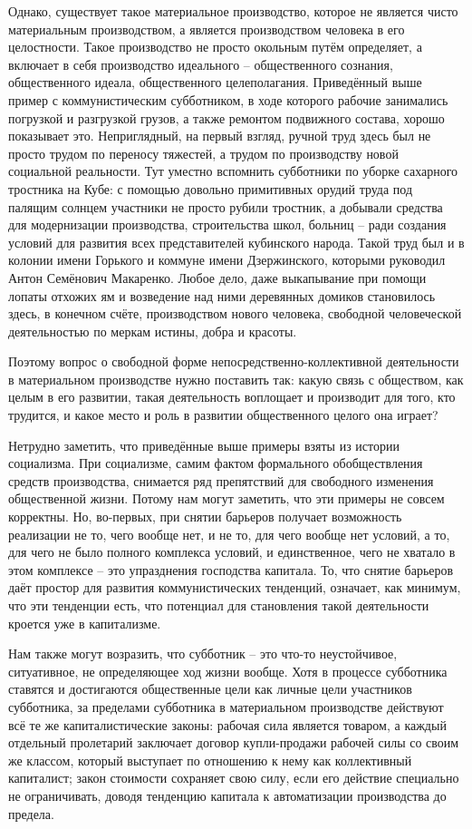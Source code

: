 \documentclass[../main]{subfiles}
\begin{document}
Однако, существует такое материальное производство, которое не является чисто материальным производством, а является производством человека в его целостности. Такое производство не просто окольным путём определяет, а включает в себя производство идеального – общественного сознания, общественного идеала, общественного целеполагания. Приведённый выше пример с коммунистическим субботником, в ходе которого рабочие занимались погрузкой и разгрузкой грузов, а также ремонтом подвижного состава, хорошо показывает это. Неприглядный, на первый взгляд, ручной труд здесь был не просто трудом по переносу тяжестей, а трудом по производству новой социальной реальности. Тут уместно вспомнить субботники по уборке сахарного тростника на Кубе: с помощью довольно примитивных орудий труда под палящим солнцем участники не просто рубили тростник, а добывали средства для модернизации производства, строительства школ, больниц – ради создания условий для развития всех представителей кубинского народа. Такой труд был и в колонии имени Горького и коммуне имени Дзержинского, которыми руководил Антон Семёнович Макаренко. Любое дело, даже выкапывание при помощи лопаты отхожих ям и возведение над ними деревянных домиков становилось здесь, в конечном счёте, производством нового человека, свободной человеческой деятельностью по меркам истины, добра и красоты.

Поэтому вопрос о свободной форме непосредственно-коллективной деятельности в материальном производстве нужно поставить так: какую связь с обществом, как целым в его развитии, такая деятельность воплощает и производит для того, кто трудится, и какое место и роль в развитии общественного целого она играет?

Нетрудно заметить, что приведённые выше примеры взяты из истории социализма. При социализме, самим фактом формального обобществления средств производства, снимается ряд препятствий для свободного изменения общественной жизни. Потому нам могут заметить, что эти примеры не совсем корректны. Но, во-первых, при снятии барьеров получает возможность реализации не то, чего вообще нет, и не то, для чего вообще нет условий, а то, для чего не было полного комплекса условий, и единственное, чего не хватало в этом комплексе – это упразднения господства капитала. То, что снятие барьеров даёт простор для развития коммунистических тенденций, означает, как минимум, что эти тенденции есть, что потенциал для становления такой деятельности кроется уже в капитализме.

Нам также могут возразить, что субботник – это что-то неустойчивое, ситуативное, не определяющее ход жизни вообще. Хотя в процессе субботника ставятся и достигаются общественные цели как личные цели участников субботника, за пределами субботника в материальном производстве действуют всё те же капиталистические законы: рабочая сила является товаром, а каждый отдельный пролетарий заключает договор купли-продажи рабочей силы со своим же классом, который выступает по отношению к нему как коллективный капиталист; закон стоимости сохраняет свою силу, если его действие специально не ограничивать, доводя тенденцию капитала к автоматизации производства до предела.
\end{document}
